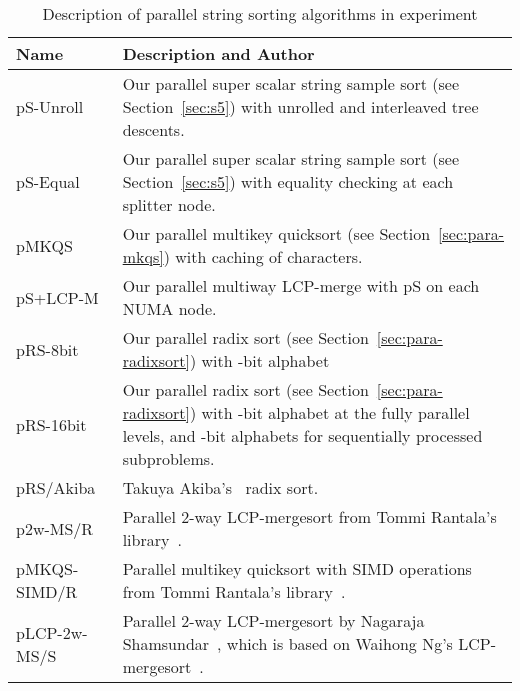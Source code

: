 \documentclass[a4paper]{myjournal}
\begin{document}
\begin{table}\centering\small
\caption{Description of parallel string sorting algorithms in experiment}\label{tab:paraalgo}
\begin{tabularx}{\linewidth}{l|X}
Name          & Description and Author                                                                                                                                                            \\ \hline
pS-Unroll & Our parallel super scalar string sample sort (see Section~\ref{sec:s5}) with unrolled and interleaved tree descents.                                                              \\
 pS-Equal & Our parallel super scalar string sample sort (see Section~\ref{sec:s5}) with equality checking at each splitter node.                                                             \\
        pMKQS & Our parallel multikey quicksort (see Section~\ref{sec:para-mkqs}) with caching of  characters.                                                                             \\
pS+LCP-M  & Our parallel multiway LCP-merge with pS on each NUMA node.                                                                                                                \\
     pRS-8bit & Our parallel radix sort (see Section~\ref{sec:para-radixsort}) with -bit alphabet                                                                                              \\
    pRS-16bit & Our parallel radix sort (see Section~\ref{sec:para-radixsort}) with -bit alphabet at the fully parallel levels, and -bit alphabets for sequentially processed subproblems. \\
    pRS/Akiba & Ta\-kuya Akiba's~\cite{akiba2011radixsort} radix sort.                                                                                                                            \\
     p2w-MS/R & Parallel 2-way LCP-mergesort from Tommi Rantala's  library~\cite{rantala2007web}.                                                                                                 \\
 pMKQS-SIMD/R & Parallel multikey quicksort with SIMD operations from Tommi Rantala's library~\cite{rantala2007web}.                                                                              \\
 pLCP-2w-MS/S & Parallel 2-way LCP-mergesort by Nagaraja Shamsundar~\cite{shamsundar2009lcpmergesort}, which is based on Waihong Ng's LCP-mergesort~\cite{ng2008merging}.                         \\ \hline
\end{tabularx}
\end{table}
 
\end{document}
